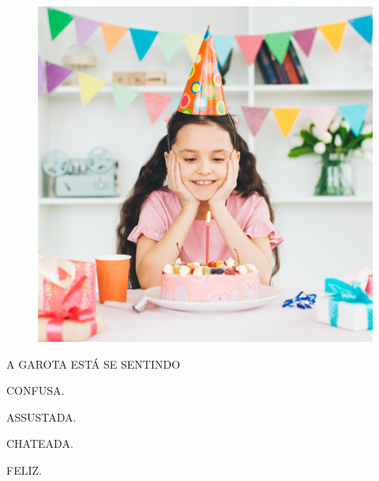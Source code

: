 \begin{figure}[H]
\includegraphics[width=\textwidth]{media/image175c.jpg}
\end{figure}

A GAROTA ESTÁ SE SENTINDO

\begin{escolha}
\item CONFUSA.

\item ASSUSTADA.

\item CHATEADA.

\item FELIZ.
\end{escolha}

\pagebreak
